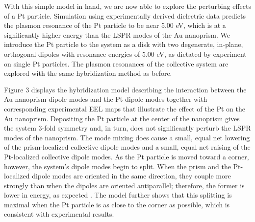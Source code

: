 \documentclass [11pt, proquest] {uwthesis}[2016/11/22]
\begin{document}
With this simple model in hand, we are now able to explore the perturbing effects of a Pt particle. Simulation using experimentally derived dielectric data \cite{Weaver} predicts the plasmon resonance of the Pt particle to be near 5.00 eV, which is at a significantly higher energy than the LSPR modes of the Au nanoprism. We introduce the Pt particle to the system as a disk with two degenerate, in-plane, orthogonal dipoles with resonance energies of 5.00 eV, as dictated by experiment on single Pt particles. The plasmon resonances of the collective system are explored with the same hybridization method as before.

Figure 3 displays the hybridization model describing the interaction between the Au nanoprism dipole modes and the Pt dipole modes together with corresponding experimental EEL maps that illustrate the effect of the Pt on the Au nanoprism. Depositing the Pt particle at the center of the nanoprism gives the system 3-fold symmetry and, in turn, does not significantly perturb the LSPR modes of the nanoprism. The mode mixing does cause a small, equal net lowering of the prism-localized collective dipole modes and a small, equal net raising of the Pt-localized collective dipole modes. As the Pt particle is moved toward a corner, however, the system’s dipole modes begin to split. When the prism and the Pt-localized dipole modes are oriented in the same direction, they couple more strongly than when the dipoles are oriented antiparallel; therefore, the former is lower in energy, as expected \cite{Quillin}. The model further shows that this splitting is maximal when the Pt particle is as close to the corner as possible, which is consistent with experimental results.
\end{document}
